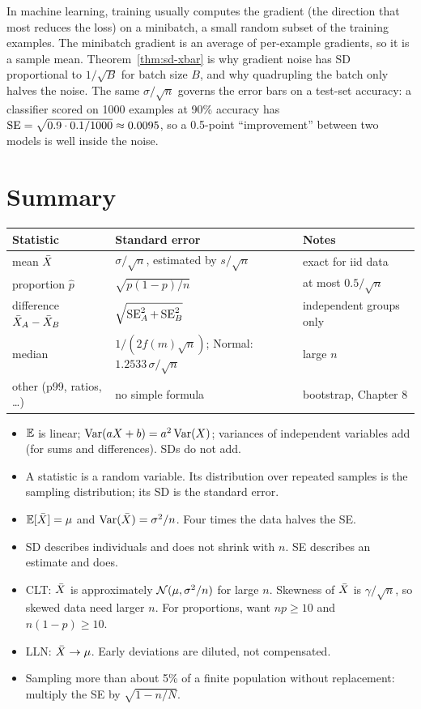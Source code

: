 \begin{connectionbox}
In machine learning, training usually computes the gradient (the direction
that most reduces the loss) on a minibatch, a small random subset of the
training examples. The minibatch gradient is an average of per-example
gradients, so it is a sample mean. Theorem~\ref{thm:sd-xbar}
is why gradient noise has SD proportional to $1/\sqrt{B}$ for batch size $B$, and
why quadrupling the batch only halves the noise. The same $\sigma/\sqrt n$ governs the
error bars on a test-set accuracy: a classifier scored on 1000 examples at 90\%
accuracy has $\operatorname{SE}=\sqrt{0.9\cdot 0.1/1000}\approx 0.0095$, so a 0.5-point
``improvement'' between two models is well inside the noise.
\end{connectionbox}

\section{Summary}
\label{sec:sd-summary}

\begin{center}
\renewcommand{\arraystretch}{1.35}
\begin{tabular}{lll}
\toprule
Statistic & Standard error & Notes\\
\midrule
mean $\bar{X}$ & $\sigma/\sqrt n$, estimated by $s/\sqrt n$ & exact for iid data\\
proportion $\hat p$ & $\sqrt{p(1-p)/n}$ & at most $0.5/\sqrt n$\\
difference $\bar{X}_A-\bar{X}_B$ & $\sqrt{\operatorname{SE}_A^2+\operatorname{SE}_B^2}$ & independent groups only\\
median & $1/(2f(m)\sqrt n)$; Normal: $1.2533\,\sigma/\sqrt n$ & large $n$\\
other (p99, ratios, \dots) & no simple formula & bootstrap, Chapter 8\\
\bottomrule
\end{tabular}
\end{center}

\begin{itemize}
  \item $\operatorname{\mathbb{E}}$ is linear; $\operatorname{Var}(aX+b)=a^2\operatorname{Var}(X)$; variances of independent variables
  add (for sums and differences). SDs do not add.
  \item A statistic is a random variable. Its distribution over repeated samples is
  the sampling distribution; its SD is the standard error.
  \item $\operatorname{\mathbb{E}}[\bar{X}]=\mu$ and $\operatorname{Var}(\bar{X})=\sigma^2/n$. Four times the data halves the
  SE.
  \item SD describes individuals and does not shrink with $n$. SE describes an
  estimate and does.
  \item CLT: $\bar{X}$ is approximately $\mathcal{N}(\mu,\sigma^2/n)$ for large $n$. Skewness of
  $\bar{X}$ is $\gamma/\sqrt n$, so skewed data need larger $n$. For proportions,
  want $np\ge 10$ and $n(1-p)\ge 10$.
  \item LLN: $\bar{X}\to\mu$. Early deviations are diluted, not compensated.
  \item Sampling more than about 5\% of a finite population without replacement:
  multiply the SE by $\sqrt{1-n/N}$.
\end{itemize}

